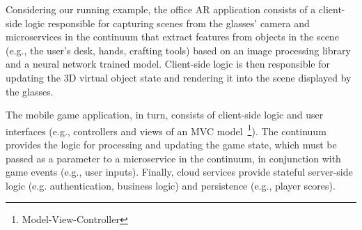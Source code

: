 






Considering our running example, the office AR application consists of a client-side logic responsible for capturing scenes from the glasses' camera and microservices in the continuum that extract features from objects in the scene (e.g., the user's desk, hands, crafting tools) based on an image processing library and a neural network trained model. Client-side logic is then responsible for updating the 3D virtual object state and rendering it into the scene displayed by the glasses.

The mobile game application, in turn, consists of client-side logic and user interfaces (e.g., controllers and views of an MVC model~\footnote{Model-View-Controller}). The continuum provides the logic for processing and updating the game state, which must be passed as a parameter to a microservice in the continuum, in conjunction with game events (e.g., user inputs). Finally, cloud services provide stateful server-side logic (e.g. authentication, business logic) and persistence (e.g., player scores). 



